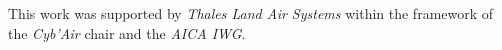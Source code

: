 \documentclass{ecai}
\newcounter{proof}
\begin{document}


\begin{ack}
    This work was supported by \emph{Thales Land Air Systems} within the framework of the \emph{Cyb'Air} chair and the \emph{AICA IWG}.
\end{ack}


\newpage






% 
\end{document}
